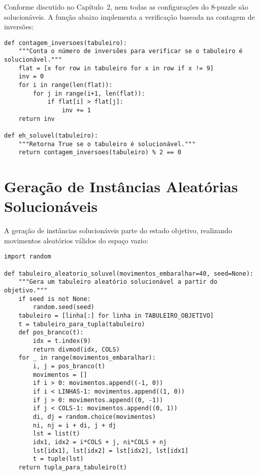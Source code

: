 Conforme discutido no Capítulo~2, nem todas as configurações do 8-puzzle são solucionáveis. A função abaixo implementa a verificação baseada na contagem de inversões:  
  
\begin{verbatim}  
def contagem_inversoes(tabuleiro):  
    """Conta o número de inversões para verificar se o tabuleiro é solucionável."""  
    flat = [x for row in tabuleiro for x in row if x != 9]  
    inv = 0  
    for i in range(len(flat)):  
        for j in range(i+1, len(flat)):  
            if flat[i] > flat[j]:  
                inv += 1  
    return inv  
  
def eh_soluvel(tabuleiro):  
    """Retorna True se o tabuleiro é solucionável."""  
    return contagem_inversoes(tabuleiro) % 2 == 0  
\end{verbatim}  
  
\section{Geração de Instâncias Aleatórias Solucionáveis}  
  
A geração de instâncias solucionáveis parte do estado objetivo, realizando movimentos aleatórios válidos do espaço vazio:  
  
\begin{verbatim}  
import random  
  
def tabuleiro_aleatorio_soluvel(movimentos_embaralhar=40, seed=None):  
    """Gera um tabuleiro aleatório solucionável a partir do objetivo."""  
    if seed is not None:  
        random.seed(seed)  
    tabuleiro = [linha[:] for linha in TABULEIRO_OBJETIVO]  
    t = tabuleiro_para_tupla(tabuleiro)  
    def pos_branco(t):  
        idx = t.index(9)  
        return divmod(idx, COLS)  
    for _ in range(movimentos_embaralhar):  
        i, j = pos_branco(t)  
        movimentos = []  
        if i > 0: movimentos.append((-1, 0))  
        if i < LINHAS-1: movimentos.append((1, 0))  
        if j > 0: movimentos.append((0, -1))  
        if j < COLS-1: movimentos.append((0, 1))  
        di, dj = random.choice(movimentos)  
        ni, nj = i + di, j + dj  
        lst = list(t)  
        idx1, idx2 = i*COLS + j, ni*COLS + nj  
        lst[idx1], lst[idx2] = lst[idx2], lst[idx1]  
        t = tuple(lst)  
    return tupla_para_tabuleiro(t)  
\end{verbatim}  
  
